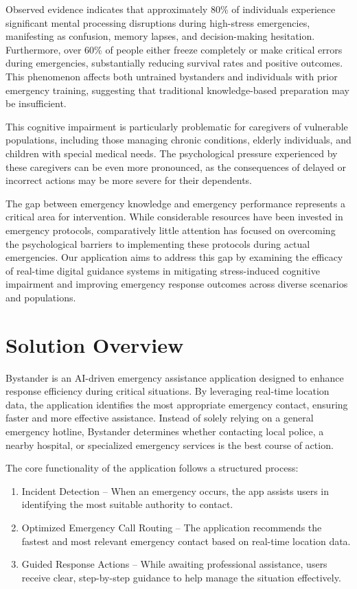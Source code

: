 Observed evidence indicates that approximately 80\% of individuals experience significant mental processing disruptions during high-stress emergencies, manifesting as confusion, memory lapses, and decision-making hesitation. Furthermore, over 60\% of people either freeze completely or make critical errors during emergencies, substantially reducing survival rates and positive outcomes. This phenomenon affects both untrained bystanders and individuals with prior emergency training, suggesting that traditional knowledge-based preparation may be insufficient.

This cognitive impairment is particularly problematic for caregivers of vulnerable populations, including those managing chronic conditions, elderly individuals, and children with special medical needs. The psychological pressure experienced by these caregivers can be even more pronounced, as the consequences of delayed or incorrect actions may be more severe for their dependents.

The gap between emergency knowledge and emergency performance represents a critical area for intervention. While considerable resources have been invested in emergency protocols, comparatively little attention has focused on overcoming the psychological barriers to implementing these protocols during actual emergencies. Our application aims to address this gap by examining the efficacy of real-time digital guidance systems in mitigating stress-induced cognitive impairment and improving emergency response outcomes across diverse scenarios and populations.


\section{Solution Overview}
\label{section:solution-overview}

Bystander is an AI-driven emergency assistance application designed to enhance response efficiency during critical situations. By leveraging real-time location data, the application identifies the most appropriate emergency contact, ensuring faster and more effective assistance. Instead of solely relying on a general emergency hotline, Bystander determines whether contacting local police, a nearby hospital, or specialized emergency services is the best course of action.

The core functionality of the application follows a structured process:
\begin{enumerate}
    \item Incident Detection – When an emergency occurs, the app assists users in identifying the most suitable authority to contact.
    \item Optimized Emergency Call Routing – The application recommends the fastest and most relevant emergency contact based on real-time location data.
    \item Guided Response Actions – While awaiting professional assistance, users receive clear, step-by-step guidance to help manage the situation effectively.
\end{enumerate}

